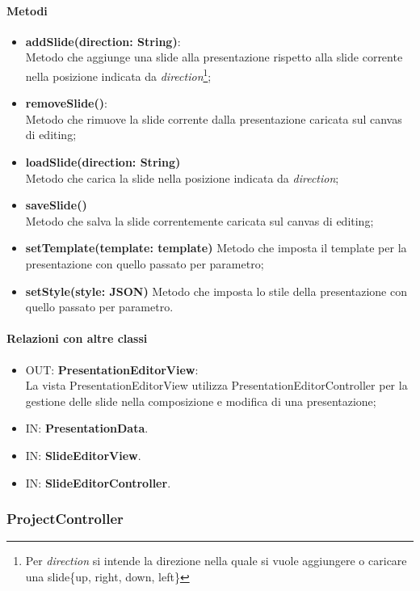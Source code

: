 	\paragraph{Metodi}
	\begin{itemize}
		\item \textbf{addSlide(direction: String)}:\\
				Metodo che aggiunge una slide alla presentazione rispetto alla slide corrente nella posizione indicata da \textit{direction}\footnote{Per \textit{direction} si intende la direzione nella quale si vuole aggiungere o caricare una slide\{up, right, down, left\}};
		\item \textbf{removeSlide()}:\\
				Metodo che rimuove la slide corrente dalla presentazione caricata sul canvas di editing;
		\item \textbf{loadSlide(direction: String)}\\
				Metodo che carica la slide nella posizione indicata da \textit{direction};
		\item \textbf{saveSlide()}\\
				Metodo che salva la slide correntemente caricata sul canvas di editing;
		\item \textbf{setTemplate(template: template)}
				Metodo che imposta il template per la presentazione con quello passato per parametro;
		\item \textbf{setStyle(style: JSON)}
				Metodo che imposta lo stile della presentazione con quello passato per parametro.
	\end{itemize}
	\paragraph{Relazioni con altre classi}
	\begin{itemize}
	  \item OUT: \textbf{PresentationEditorView}:\\
		La vista PresentationEditorView utilizza PresentationEditorController per la gestione delle slide nella composizione e modifica di una presentazione;	
	  \item IN: \textbf{PresentationData}.
	  \item IN: \textbf{SlideEditorView}.
	  \item IN: \textbf{SlideEditorController}.
	\end{itemize}  
\subsubsection{ProjectController}

